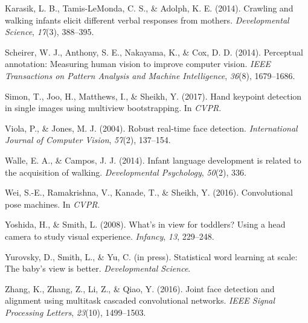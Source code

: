 \documentclass[english,man,floatsintext,draftall]{apa6}
\begin{document}
\hypertarget{ref-karasik2014}{}
Karasik, L. B., Tamis-LeMonda, C. S., \& Adolph, K. E. (2014). Crawling
and walking infants elicit different verbal responses from mothers.
\emph{Developmental Science}, \emph{17}(3), 388--395.

\hypertarget{ref-scheirer2014perceptual}{}
Scheirer, W. J., Anthony, S. E., Nakayama, K., \& Cox, D. D. (2014).
Perceptual annotation: Measuring human vision to improve computer
vision. \emph{IEEE Transactions on Pattern Analysis and Machine
Intelligence}, \emph{36}(8), 1679--1686.

\hypertarget{ref-simon2017hand}{}
Simon, T., Joo, H., Matthews, I., \& Sheikh, Y. (2017). Hand keypoint
detection in single images using multiview bootstrapping. In
\emph{CVPR}.

\hypertarget{ref-viola2004robust}{}
Viola, P., \& Jones, M. J. (2004). Robust real-time face detection.
\emph{International Journal of Computer Vision}, \emph{57}(2), 137--154.

\hypertarget{ref-walle2014}{}
Walle, E. A., \& Campos, J. J. (2014). Infant language development is
related to the acquisition of walking. \emph{Developmental Psychology},
\emph{50}(2), 336.

\hypertarget{ref-wei2016cpm}{}
Wei, S.-E., Ramakrishna, V., Kanade, T., \& Sheikh, Y. (2016).
Convolutional pose machines. In \emph{CVPR}.

\hypertarget{ref-yoshida2008}{}
Yoshida, H., \& Smith, L. (2008). What's in view for toddlers? Using a
head camera to study visual experience. \emph{Infancy}, \emph{13},
229--248.

\hypertarget{ref-yurovsky2012}{}
Yurovsky, D., Smith, L., \& Yu, C. (in press). Statistical word learning
at scale: The baby's view is better. \emph{Developmental Science}.

\hypertarget{ref-zhang2016}{}
Zhang, K., Zhang, Z., Li, Z., \& Qiao, Y. (2016). Joint face detection
and alignment using multitask cascaded convolutional networks.
\emph{IEEE Signal Processing Letters}, \emph{23}(10), 1499--1503.

\endgroup
\end{document}
